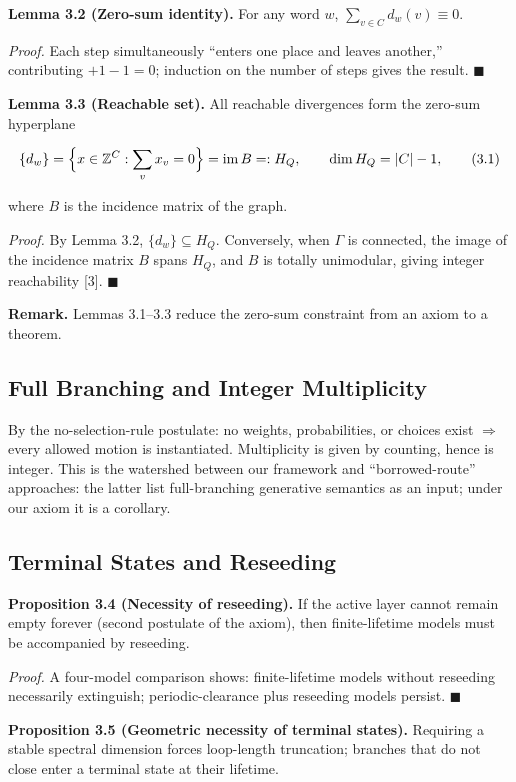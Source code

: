 \documentclass[
  11pt,
]{article}
\begin{document}
\textbf{Lemma 3.2 (Zero-sum identity).} For any word \(w\),
\(\sum_{v\in C}d_w(v)\equiv 0\).

\emph{Proof.} Each step simultaneously ``enters one place and leaves
another,'' contributing \(+1-1=0\); induction on the number of steps
gives the result. \(\blacksquare\)

\textbf{Lemma 3.3 (Reachable set).} All reachable divergences form the
zero-sum hyperplane

\[
\{d_w\} = \Bigl\{x\in\mathbb Z^C : \sum_v x_v=0\Bigr\} = \operatorname{im} B =: H_Q, \qquad \dim H_Q = |C|-1,
\tag{3.1}
\]

where \(B\) is the incidence matrix of the graph.

\emph{Proof.} By Lemma 3.2, \(\{d_w\}\subseteq H_Q\). Conversely, when
\(\Gamma\) is connected, the image of the incidence matrix \(B\) spans
\(H_Q\), and \(B\) is totally unimodular, giving integer reachability
{[}3{]}. \(\blacksquare\)

\textbf{Remark.} Lemmas 3.1--3.3 reduce the zero-sum constraint from an
axiom to a theorem.

\subsection{Full Branching and Integer
Multiplicity}\label{full-branching-and-integer-multiplicity}

By the no-selection-rule postulate: no weights, probabilities, or
choices exist \(\Rightarrow\) every allowed motion is instantiated.
Multiplicity is given by counting, hence is integer. This is the
watershed between our framework and ``borrowed-route'' approaches: the
latter list full-branching generative semantics as an input; under our
axiom it is a corollary.

\subsection{Terminal States and
Reseeding}\label{terminal-states-and-reseeding}

\textbf{Proposition 3.4 (Necessity of reseeding).} If the active layer
cannot remain empty forever (second postulate of the axiom), then
finite-lifetime models must be accompanied by reseeding.

\emph{Proof.} A four-model comparison shows: finite-lifetime models
without reseeding necessarily extinguish; periodic-clearance plus
reseeding models persist. \(\blacksquare\)

\textbf{Proposition 3.5 (Geometric necessity of terminal states).}
Requiring a stable spectral dimension forces loop-length truncation;
branches that do not close enter a terminal state at their lifetime.
\end{document}
